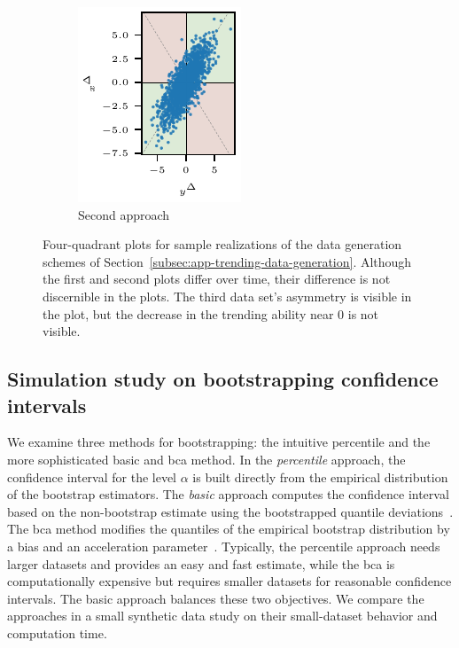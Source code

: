 \documentclass[pdflatex]{sn-jnl}
\theoremstyle{plain}%
\theoremstyle{definition}
\begin{document}
\begin{figure}
\begin{subfigure}{0.24\textwidth}
    \end{subfigure}\hspace{0.01\textwidth}
    \begin{subfigure}{0.24\textwidth}
        \includegraphics{plots/illustrative_examples/appendix_4q_dgp2}
        \caption{Second approach}
    \end{subfigure}
    \caption[Four-quadrant plots for sample realizations of the data generation schemes of Section~\ref{subsec:app-trending-data-generation}.]{Four-quadrant plots for sample realizations of the data generation schemes of Section~\ref{subsec:app-trending-data-generation}. Although the first and second plots differ over time, their difference is not discernible in the plots. The third data set's asymmetry is visible in the plot, but the decrease in the trending ability near 0 is not visible. }
    \label{fig:appendix_dgps}
\end{figure}

\subsection{Simulation study on bootstrapping confidence intervals}\label{subsec:appendix-trending-bootstrap}


We examine three methods for bootstrapping: the intuitive percentile and the more sophisticated basic and \ac{bca} method.
In the \textit{percentile} approach, the confidence interval for the level $\alpha$ is built directly from the empirical distribution of the bootstrap estimators.
The \textit{basic} approach computes the confidence interval based on the non-bootstrap estimate using the bootstrapped quantile deviations~\citep{Davison1997}.
The \ac{bca} method modifies the quantiles of the empirical bootstrap distribution by a bias and an acceleration parameter~\citep{Efron1987}.
Typically, the percentile approach needs larger datasets and provides an easy and fast estimate, while the \ac{bca} is computationally expensive but requires smaller datasets for reasonable confidence intervals.
The basic approach balances these two objectives.
We compare the approaches in a small synthetic data study on their small-dataset behavior and computation time.
\end{document}
